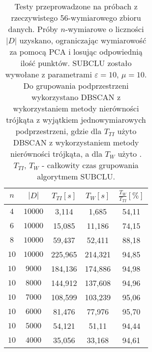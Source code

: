 \begin{table}
	\centering
	\begin{tabular}{| c | c | c | c | c |}
		\hline
		$ n $ & $ |D| $ & $ T_{TI} [s]$ & $ T_{W} [s]$ & $ \frac{T_{W}}{T_{TI}} [\%] $ \\ \hline
		$ 4 $  & $ 10000 $	& 3,114 	& 1,685    & 54,11 \\ \hline
		$ 6 $  & $ 10000 $	& 15,085 	& 11,186   & 74,15 \\ \hline
		$ 8 $  & $ 10000 $	& 59,437 	& 52,411 	 & 88,18 \\ \hline
		$ 10 $ & $ 10000 $  & 225,965 & 214,321  & 94,85 \\ \hline
		$ 10 $ & $ 9000 $ 	& 184,136 & 174,886  & 94,98 \\ \hline
		$ 10 $ & $ 8000 $ 	& 144,912 & 137,608  & 94,96 \\ \hline
		$ 10 $ & $ 7000 $ 	& 108,599 & 103,239  & 95,06 \\ \hline
		$ 10 $ & $ 6000 $ 	& 81,476 	& 77,976 	 & 95,70 \\ \hline
		$ 10 $ & $ 5000 $ 	& 54,121 	& 51,11 	 & 94,44 \\ \hline
		$ 10 $ & $ 4000 $ 	& 35,056 	& 33,168 	 & 94,61 \\ \hline




	\end{tabular}
	\caption{Testy przeprowadzone na próbach z rzeczywistego 56-wymiarowego zbioru danych. Próby $ n $-wymiarowe o liczności $ |D| $ uzyskano, ograniczając wymiarowość za pomocą PCA i losując odpowiednią ilość punktów. SUBCLU zostało wywołane z parametrami $ \varepsilon=10 $, $ \mu=10 $. Do grupowania podprzestrzeni wykorzystano DBSCAN z wykorzystaniem metody nierówności trójkąta z wyjątkiem jednowymiarowych podprzestrzeni, gdzie dla $ T_{TI} $ użyto DBSCAN z wykorzystaniem metody nierówności trójkąta, a dla $ T_{W} $ użyto . $ T_{TI},\,T_{W} $ - całkowity czas grupowania algorytmem SUBCLU.}\label{odc:real-test}
\end{table} 